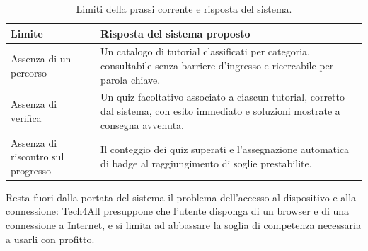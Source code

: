 \begin{table}[H]
\centering
\begin{tabular}{@{}L{4.6cm} L{9.6cm}@{}}
\toprule
\textbf{Limite} & \textbf{Risposta del sistema proposto} \\
\midrule
Assenza di un percorso &
Un catalogo di tutorial classificati per categoria, consultabile senza
barriere d'ingresso e ricercabile per parola chiave. \\

Assenza di verifica &
Un quiz facoltativo associato a ciascun tutorial, corretto dal sistema, con
esito immediato e soluzioni mostrate a consegna avvenuta. \\

Assenza di riscontro sul progresso &
Il conteggio dei quiz superati e l'assegnazione automatica di badge al
raggiungimento di soglie prestabilite. \\
\bottomrule
\end{tabular}
\caption{Limiti della prassi corrente e risposta del sistema.}
\label{tab:rad-limiti}
\end{table}

Resta fuori dalla portata del sistema il problema dell'accesso al dispositivo
e alla connessione: Tech4All presuppone che l'utente disponga di un browser e
di una connessione a Internet, e si limita ad abbassare la soglia di
competenza necessaria a usarli con profitto.
